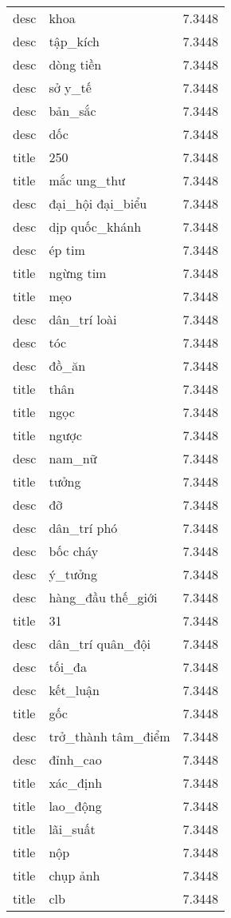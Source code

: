 \documentclass{article}
\begin{document}
\begin{tabular}{lll}
desc & khoa & 7.3448\\
desc & tập\_kích & 7.3448\\
desc & dòng tiền & 7.3448\\
desc & sở y\_tế & 7.3448\\
desc & bản\_sắc & 7.3448\\
desc & dốc & 7.3448\\
title & 250 & 7.3448\\
title & mắc ung\_thư & 7.3448\\
desc & đại\_hội đại\_biểu & 7.3448\\
desc & dịp quốc\_khánh & 7.3448\\
desc & ép tim & 7.3448\\
title & ngừng tim & 7.3448\\
title & mẹo & 7.3448\\
desc & dân\_trí loài & 7.3448\\
desc & tóc & 7.3448\\
desc & đồ\_ăn & 7.3448\\
title & thân & 7.3448\\
title & ngọc & 7.3448\\
title & ngược & 7.3448\\
desc & nam\_nữ & 7.3448\\
title & tưởng & 7.3448\\
desc & đỡ & 7.3448\\
desc & dân\_trí phó & 7.3448\\
desc & bốc cháy & 7.3448\\
desc & ý\_tưởng & 7.3448\\
desc & hàng\_đầu thế\_giới & 7.3448\\
title & 31 & 7.3448\\
desc & dân\_trí quân\_đội & 7.3448\\
desc & tối\_đa & 7.3448\\
desc & kết\_luận & 7.3448\\
title & gốc & 7.3448\\
desc & trở\_thành tâm\_điểm & 7.3448\\
desc & đỉnh\_cao & 7.3448\\
title & xác\_định & 7.3448\\
title & lao\_động & 7.3448\\
title & lãi\_suất & 7.3448\\
title & nộp & 7.3448\\
title & chụp ảnh & 7.3448\\
title & clb & 7.3448\\

\end{tabular}
\end{document}
